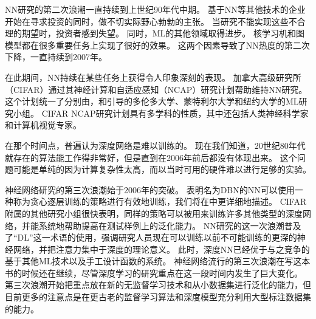 \gls{NN}研究的第二次浪潮一直持续到上世纪90年代中期。
基于\gls{NN}等其他技术的企业开始在寻求投资的同时，做不切实际野心勃勃的主张。
当研究不能实现这些不合理的期望时，投资者感到失望。
同时，\gls{ML}的其他领域取得进步。
核学习机\citep{Boser92,Cortes95,SchBurSmo99}和图模型\citep{Jordan98}都在很多重要任务上实现了很好的效果。
这两个因素导致了\gls{NN}热度的第二次下降，一直持续到2007年。

在此期间，\gls{NN}持续在某些任务上获得令人印象深刻的表现\citep{LeCun98-small,Bengio-nnlm2001}。
加拿大高级研究所（CIFAR）通过其神经计算和自适应感知（NCAP）研究计划帮助维持\gls{NN}研究。
这个计划统一了分别由，和引导的多伦多大学、蒙特利尔大学和纽约大学的\gls{ML}研究小组。
CIFAR NCAP研究计划具有多学科的性质，其中还包括人类神经科学家和计算机视觉专家。


在那个时间点，普遍认为深度网络是难以训练的。
现在我们知道，20世纪80年代就存在的算法能工作得非常好，但是直到在2006年前后都没有体现出来。
这个问题可能是单纯的因为计算复杂性太高，而以当时可用的硬件难以进行足够的实验。

神经网络研究的第三次浪潮始于2006年的突破。
表明名为\gls{DBN}的\gls{NN}可以使用一种称为贪心逐层训练的策略进行有效地训练\citep{Hinton06}，我们将在中更详细地描述。
CIFAR附属的其他研究小组很快表明，同样的策略可以被用来训练许多其他类型的深度网络\citep{Bengio+Lecun-chapter2007-small,ranzato-07}，并能系统地帮助提高在测试样例上的泛化能力。
\gls{NN}研究的这一次浪潮普及了``\gls{DL}''这一术语的使用，强调研究人员现在可以训练以前不可能训练的更深的神经网络，并把注意力集中于深度的理论意义\citep{Bengio+Lecun-chapter2007,Delalleau+Bengio-2011-small,Pascanu-et-al-ICLR2014,Montufar-et-al-NIPS2014}。
此时，深度\gls{NN}已经优于与之竞争的基于其他\gls{ML}技术以及手工设计函数的系统。
神经网络流行的第三次浪潮在写这本书的时候还在继续，尽管深度学习的研究重点在这一段时间内发生了巨大变化。
第三次浪潮开始把重点放在新的无监督学习技术和从小数据集进行泛化的能力，但目前更多的注意点是在更古老的监督学习算法和深度模型充分利用大型标注数据集的能力。

